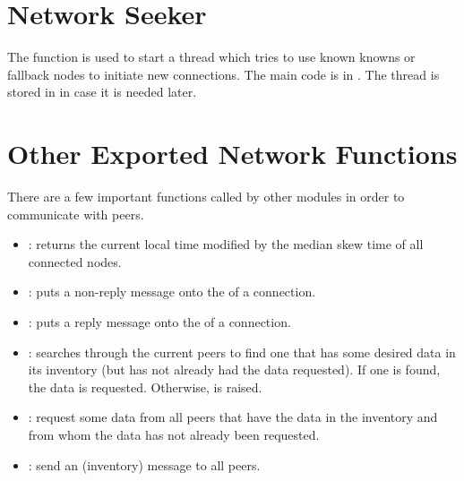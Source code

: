 \section{Network Seeker}

The function {} is used to start a thread
which tries to use known knowns or fallback nodes to initiate
new connections.
The main code is in {}.
The thread is stored in {}
in case it is needed later.

\section{Other Exported Network Functions}

There are a few important functions called by other modules in order to
communicate with peers.

\begin{itemize}
\item {}: returns the current local time modified by the median skew time of all connected nodes.
\item {}: puts a non-reply message onto the {} of a connection.
\item {}: puts a reply message onto the {} of a connection.
\item {}: searches through the current peers to find
one that has some desired data in its inventory (but has not already had the data requested).
If one is found, the data is requested.
Otherwise, {} is raised.
\item {}: request some data from all peers that have
the data in the inventory and from whom the data has not already been requested.
\item {}: send an {} (inventory) message to all peers.
\end{itemize}

